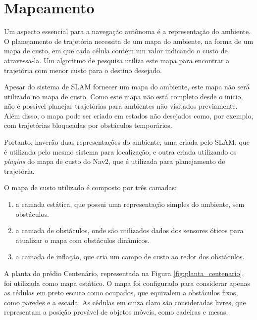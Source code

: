 \documentclass[repeatfields,xlists,xpacks,oneside,yearsonly]{ufrgscca}
\begin{document}


\section{Mapeamento}

Um aspecto essencial para a navegação autônoma é a representação do ambiente.
O planejamento de trajetória necessita de um mapa do ambiente, na forma
de um mapa de custo, em que cada célula contém um valor indicando o custo
de atravessa-la. Um algoritmo de pesquisa utiliza este mapa para encontrar
a trajetória com menor custo para o destino desejado.

Apesar do sistema de SLAM fornecer um mapa do ambiente, este mapa não será
utilizado no mapa de custo. Como este mapa não está completo desde o início,
não é possível planejar trajetórias para ambientes não visitados previamente.
Além disso, o mapa pode ser criado em estados não desejados como,
por exemplo, com trajetórias bloqueadas por obstáculos temporários.

Portanto, haverão duas representações do ambiente, uma criada pelo SLAM, que 
é utilizada pelo mesmo sistema para localização, e outra criada utilizando
os \textit{plugins} do mapa de custo do Nav2, que é utilizada para planejamento
de trajetória.

O mapa de custo utilizado é composto por três camadas: 
\begin{enumerate}
    \item a camada estática, que possui uma representação simples do ambiente,
     sem obstáculos.
    \item a camada de obstáculos, onde são utilizados dados dos sensores óticos
    para atualizar o mapa com obstáculos dinâmicos.
    \item a camada de inflação, que cria um campo de custo ao redor dos obstáculos.
\end{enumerate}

A planta do prédio Centenário, representada na Figura \ref{fig:planta_centenario},
foi utilizada como mapa estático. O mapa foi configurado para considerar apenas as 
cédulas em preto escuro como ocupados, que equivalem a obstáculos fixos, como paredes
e a escada. As cédulas em cinza claro são consideradas livres, que representam a posição 
provável de objetos móveis, como cadeiras e mesas.
\end{document}
